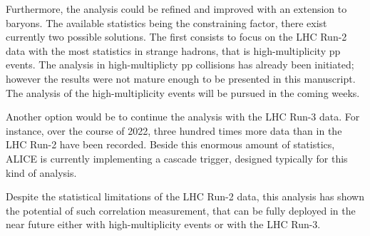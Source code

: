 Furthermore, the analysis could be refined and improved with an extension to \rmOmega baryons. The available statistics being the constraining factor, there exist currently two possible solutions. The first consists to focus on the LHC Run-2 data with the most statistics in strange hadrons, that is high-multiplicity pp events. The analysis in high-multiplicty pp collisions has already been initiated; however the results were not mature enough to be presented in this manuscript. The analysis of the high-multiplicity events will be pursued in the coming weeks.

Another option would be to continue the analysis with the LHC Run-3 data. For instance, over the course of 2022, three hundred times more data than in the LHC Run-2 have been recorded. Beside this enormous amount of statistics, ALICE is currently implementing a cascade trigger, designed typically for this kind of analysis. 

Despite the statistical limitations of the LHC Run-2 data, this analysis has shown the potential of such correlation measurement, that can be fully deployed in the near future either with high-multiplicity events or with the LHC Run-3.



